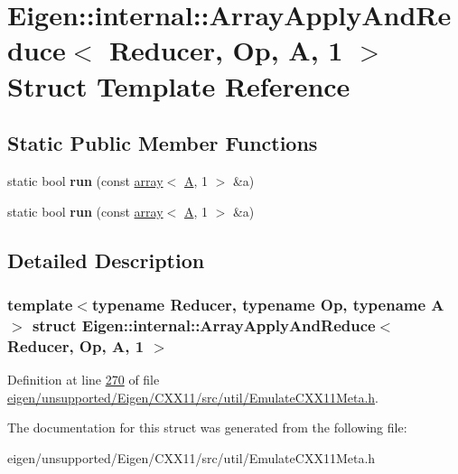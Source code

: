 \hypertarget{struct_eigen_1_1internal_1_1_array_apply_and_reduce_3_01_reducer_00_01_op_00_01_a_00_011_01_4}{}\section{Eigen\+:\+:internal\+:\+:Array\+Apply\+And\+Reduce$<$ Reducer, Op, A, 1 $>$ Struct Template Reference}
\label{struct_eigen_1_1internal_1_1_array_apply_and_reduce_3_01_reducer_00_01_op_00_01_a_00_011_01_4}
\subsection*{Static Public Member Functions}
\begin{DoxyCompactItemize}
\item 
\mbox{\label{struct_eigen_1_1internal_1_1_array_apply_and_reduce_3_01_reducer_00_01_op_00_01_a_00_011_01_4_a86038e3ca376b2778f265e644bb35ff3}} 
static bool {\bfseries run} (const \hyperlink{class_eigen_1_1array}{array}$<$ \hyperlink{group___core___module_class_eigen_1_1_matrix}{A}, 1 $>$ \&a)
\item 
\mbox{\label{struct_eigen_1_1internal_1_1_array_apply_and_reduce_3_01_reducer_00_01_op_00_01_a_00_011_01_4_a86038e3ca376b2778f265e644bb35ff3}} 
static bool {\bfseries run} (const \hyperlink{class_eigen_1_1array}{array}$<$ \hyperlink{group___core___module_class_eigen_1_1_matrix}{A}, 1 $>$ \&a)
\end{DoxyCompactItemize}


\subsection{Detailed Description}
\subsubsection*{template$<$typename Reducer, typename Op, typename A$>$\newline
struct Eigen\+::internal\+::\+Array\+Apply\+And\+Reduce$<$ Reducer, Op, A, 1 $>$}



Definition at line \hyperlink{eigen_2unsupported_2_eigen_2_c_x_x11_2src_2util_2_emulate_c_x_x11_meta_8h_source_l00270}{270} of file \hyperlink{eigen_2unsupported_2_eigen_2_c_x_x11_2src_2util_2_emulate_c_x_x11_meta_8h_source}{eigen/unsupported/\+Eigen/\+C\+X\+X11/src/util/\+Emulate\+C\+X\+X11\+Meta.\+h}.



The documentation for this struct was generated from the following file\+:\begin{DoxyCompactItemize}
\item 
eigen/unsupported/\+Eigen/\+C\+X\+X11/src/util/\+Emulate\+C\+X\+X11\+Meta.\+h\end{DoxyCompactItemize}
